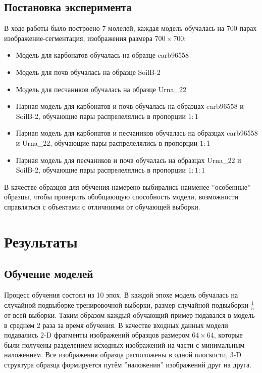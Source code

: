 \documentclass[14pt, a4paper, oneside, bold]{extarticle}
\begin{document}
\subsection{Постановка эксперимента}

В ходе работы было построено 7 молелей, каждая модель обучалась на 700 парах изображение-сегментация, изображения размера $700\times700$: 
\begin{itemize}
	\item Модель для карбонатов обучалась на образце carb96558
	
	\item Модель для почв обучалась на образце SoilB-2
	
	\item Модель для песчаников обучалась на образце Urna\_22
	
	\item Парная модель для карбонатов и почв обучалась на образцах carb96558 и SoilB-2, обучающие пары распрелелялись в пропорции $1:1$
	
	\item Парная модель для карбонатов и песчаников обучалась на образцах carb96558 и Urna\_22, обучающие пары распрелелялись в пропорции $1:1$
	
	\item  Парная модель для песчаников и почв обучалась на образцах Urna\_22 и SoilB-2, обучающие пары распрелелялись в пропорции $1:1:1$
\end{itemize}

В качестве образцов для обучения намерено выбирались наименее ''особенные'' образцы, чтобы проверить обобщающую способность модели, возможности справляться с объектами с отличниями от обучающей выборки.

\newpage


\section{Результаты} \label{seg_results}

\subsection{Обучение моделей}

Процесс обучения состоял из 10 эпох. В каждой эпохе модель обучалась на случайной подвыборке тренировочной выборки, размер случайной подвыборки $\frac{1}{5}$ от всей выборки. Таким образом каждый обучающий пример подавался в модель в среднем 2 раза за время обучения. В качестве входных данных модели подавались 2-D фрагменты изображений образцов размером $64 \times 64$, которые были получены разделением исходных изображений на части с минимальным наложением.
Все изображения образца расположены в одной плоскости, 3-D структура образца формируется путём ''наложения'' изображений друг на друга.
\end{document}
